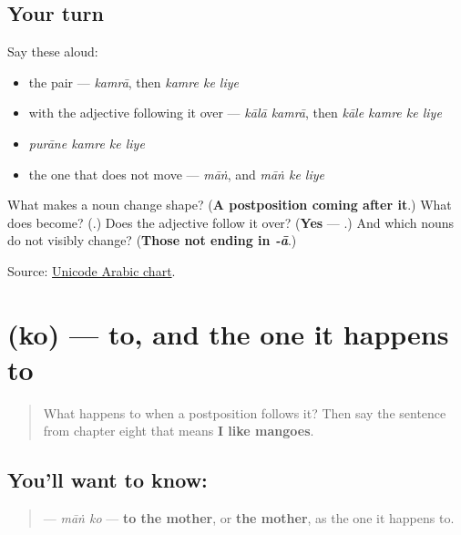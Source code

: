 \subsection*{Your turn}
Say these aloud:

\begin{itemize}
\raggedright
  \item the pair — \emph{kamrā}, then \emph{kamre ke liye}
  \item with the adjective following it over — \emph{kālā kamrā}, then \emph{kāle kamre ke liye}
  \item \emph{purāne kamre ke liye}
  \item the one that does not move — \emph{māṅ}, and \emph{māṅ ke liye}
\end{itemize}

\begin{tcolorbox}[breakable,colback=teal!4,colframe=teal!35!black,title={Before you move on}]
What makes a noun change shape? (\textbf{A postposition coming after it}.) What does \textbf{} become? (\textbf{}.) Does the adjective follow it over? (\textbf{Yes} — \textbf{ }.) And which nouns do not visibly change? (\textbf{Those not ending in \emph{-ā}}.)

Source: \href{https://www.unicode.org/charts/PDF/U0600.pdf}{Unicode Arabic chart}.
\end{tcolorbox}
\section[\texorpdfstring{\ur{کو} (ko)}{کو (ko)}]{ (ko) — to, and the one it happens to}

\label{lesson:UR-C23-ko}



\begin{quote}
What happens to \textbf{} when a postposition follows it? Then say the sentence from chapter eight that means \textbf{I like mangoes}.
\end{quote}

\subsection*{You'll want to know: }
\begin{quote}
\textbf{ } — \emph{māṅ ko} — \textbf{to the mother}, or \textbf{the mother}, as the one it happens to.
\end{quote}

